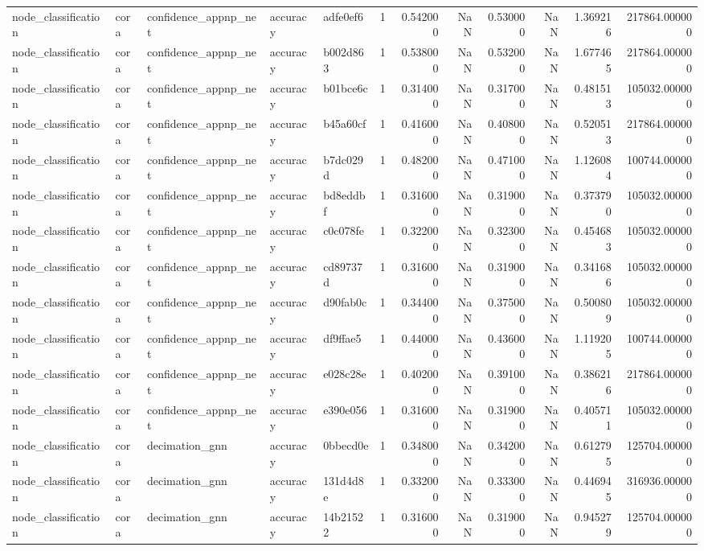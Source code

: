 \begin{tabular}{lllllrrrrrrr}
node_classification & cora & confidence_appnp_net & accuracy & adfe0ef6 & 1 & 0.542000 & NaN & 0.530000 & NaN & 1.369216 & 217864.000000 \\
node_classification & cora & confidence_appnp_net & accuracy & b002d863 & 1 & 0.538000 & NaN & 0.532000 & NaN & 1.677465 & 217864.000000 \\
node_classification & cora & confidence_appnp_net & accuracy & b01bce6c & 1 & 0.314000 & NaN & 0.317000 & NaN & 0.481513 & 105032.000000 \\
node_classification & cora & confidence_appnp_net & accuracy & b45a60cf & 1 & 0.416000 & NaN & 0.408000 & NaN & 0.520513 & 217864.000000 \\
node_classification & cora & confidence_appnp_net & accuracy & b7dc029d & 1 & 0.482000 & NaN & 0.471000 & NaN & 1.126084 & 100744.000000 \\
node_classification & cora & confidence_appnp_net & accuracy & bd8eddbf & 1 & 0.316000 & NaN & 0.319000 & NaN & 0.373790 & 105032.000000 \\
node_classification & cora & confidence_appnp_net & accuracy & c0c078fe & 1 & 0.322000 & NaN & 0.323000 & NaN & 0.454683 & 105032.000000 \\
node_classification & cora & confidence_appnp_net & accuracy & cd89737d & 1 & 0.316000 & NaN & 0.319000 & NaN & 0.341686 & 105032.000000 \\
node_classification & cora & confidence_appnp_net & accuracy & d90fab0c & 1 & 0.344000 & NaN & 0.375000 & NaN & 0.500809 & 105032.000000 \\
node_classification & cora & confidence_appnp_net & accuracy & df9ffae5 & 1 & 0.440000 & NaN & 0.436000 & NaN & 1.119205 & 100744.000000 \\
node_classification & cora & confidence_appnp_net & accuracy & e028c28e & 1 & 0.402000 & NaN & 0.391000 & NaN & 0.386216 & 217864.000000 \\
node_classification & cora & confidence_appnp_net & accuracy & e390e056 & 1 & 0.316000 & NaN & 0.319000 & NaN & 0.405711 & 105032.000000 \\
node_classification & cora & decimation_gnn & accuracy & 0bbecd0e & 1 & 0.348000 & NaN & 0.342000 & NaN & 0.612795 & 125704.000000 \\
node_classification & cora & decimation_gnn & accuracy & 131d4d8e & 1 & 0.332000 & NaN & 0.333000 & NaN & 0.446945 & 316936.000000 \\
node_classification & cora & decimation_gnn & accuracy & 14b21522 & 1 & 0.316000 & NaN & 0.319000 & NaN & 0.945279 & 125704.000000 \\

\end{tabular}
